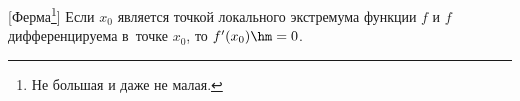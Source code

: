 [Ферма\footnote{Не большая и даже не малая.}]\label{Ferma} Если $x_0$ является точкой локального экстремума функции $f$ и $f$ дифференцируема в~точке $x_0$, то $f'(x_0)\hm=0$.

 